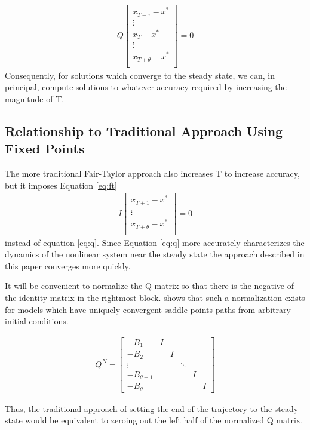 \documentclass[12pt]{article}
\begin{document}
 \begin{gather}
Q
\left [
\begin{array}{c}
x_{T-\tau}-x^\ast\\
\vdots\\
x_{T}-x^\ast\\
\vdots\\
x_{T+\theta}-x^\ast\\
\end{array}
\right ]
=0
\label{eq:q}
 \end{gather}
Consequently, for solutions which converge to the steady state, 
 we can, in principal, compute solutions
to whatever accuracy required by increasing the magnitude of T.


\subsection{Relationship to Traditional Approach Using Fixed Points }
The more traditional Fair-Taylor approach also
increases T to increase accuracy, but it imposes Equation \ref{eq:ft}
\begin{gather}
I
\left [
\begin{array}{c}
x_{T+1}-x^\ast\\
\vdots\\
x_{T+\theta}-x^\ast\\
\end{array}
\right ]
=0\label{eq:ft}
\end{gather}
 instead  of equation \ref{eq:q}. 
Since Equation \ref{eq:q} more accurately characterizes the dynamics of the
nonlinear system near the steady state the approach described in this paper
converges more quickly.

It will be convenient to normalize the Q matrix so that there is the negative
of the identity matrix in the rightmost block. 
\cite{ANDER:AIM2} shows that such a normalization exists
for models which have uniquely
convergent saddle points paths from arbitrary initial conditions. 

\begin{gather}
Q^N=
\begin{bmatrix}
    -B_1&I\\-B_2&&I\\ \vdots&&&\ddots \\ -B_{\theta-1}&&&&I \\-B_\theta&&&&&I
\end{bmatrix}
\end{gather}

Thus, the traditional approach of setting the end of the trajectory to 
the steady state would be equivalent to zeroing out the left half of the
normalized Q matrix.
\end{document}
